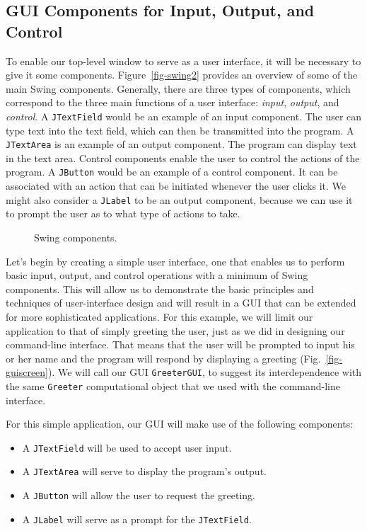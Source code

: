 \subsection{GUI Components for Input, Output, and Control}

To enable our top-level window to serve as a user interface, it will
be necessary to give it some components. Figure~\ref{fig-swing2}
provides an overview of some of the main Swing components. Generally,
there are three types of components, which correspond to the three
main functions of a user interface: {\em input}, {\em output}, and
{\em control}. A {\tt JTextField} would be an example of an input
component. The user can type text into the text field, which can then
be transmitted into the program. A {\tt JTextArea} is an example of an
output component. The program can display text in the text
area. Control components enable the user to control the actions of the
program. A {\tt JButton} would be an example of a control
component. It can be associated with an action that can be initiated
whenever the user clicks it. We might also consider a {\tt JLabel}
to be an output component, because we can use it to prompt the user as
to what type of actions to take.

\begin{figure}[tb]
{Swing components.
\label{fig-swing2}
\label{pg-fig-swing2}}
\end{figure}

Let's begin by creating a simple user interface, one that enables us
to perform basic input, output, and control operations with a minimum
of Swing components. This will allow us to demonstrate the basic
principles and techniques of user-interface design and will result in
a GUI that can be extended for more sophisticated applications. For
this example, we will limit our application to that of simply greeting
the user, just as we did in designing our command-line interface.
That means that the user will be prompted to input his or her name and
the program will respond by displaying a greeting
(Fig.~\ref{fig-guiscreen}).  We will call our GUI {\tt GreeterGUI},
to suggest its interdependence with the same {\tt Greeter}
computational object that we used with the command-line interface.

For this simple application, our GUI will make use of the following
components:

\begin{itemize}
\item A {\tt JTextField} will be used to accept user input.
\item A {\tt JTextArea} will serve to display the program's output.
\item A {\tt JButton} will allow the user to request the greeting.
\item A {\tt JLabel} will serve as a prompt for the {\tt JTextField}.
\end{itemize}

